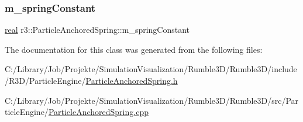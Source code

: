\mbox{\label{classr3_1_1_particle_anchored_spring_a0c220ca894297faeb2ea7b97dea9c27e}} 
\subsubsection{\texorpdfstring{m\+\_\+spring\+Constant}{m\_springConstant}}
{\footnotesize\ttfamily \mbox{\hyperlink{namespacer3_ab2016b3e3f743fb735afce242f0dc1eb}{real}} r3\+::\+Particle\+Anchored\+Spring\+::m\+\_\+spring\+Constant\hspace{0.3cm}{\ttfamily [protected]}}



The documentation for this class was generated from the following files\+:\begin{DoxyCompactItemize}
\item 
C\+:/\+Library/\+Job/\+Projekte/\+Simulation\+Visualization/\+Rumble3\+D/\+Rumble3\+D/include/\+R3\+D/\+Particle\+Engine/\mbox{\hyperlink{_particle_anchored_spring_8h}{Particle\+Anchored\+Spring.\+h}}\item 
C\+:/\+Library/\+Job/\+Projekte/\+Simulation\+Visualization/\+Rumble3\+D/\+Rumble3\+D/src/\+Particle\+Engine/\mbox{\hyperlink{_particle_anchored_spring_8cpp}{Particle\+Anchored\+Spring.\+cpp}}\end{DoxyCompactItemize}
